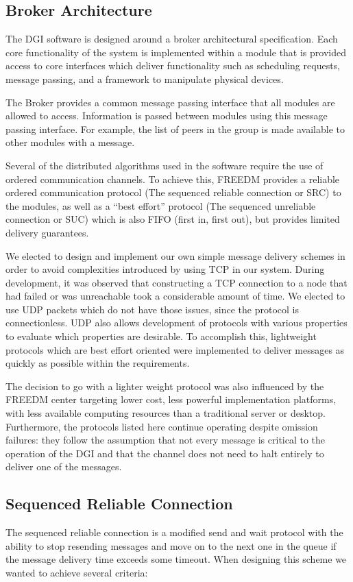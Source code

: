 \subsection{Broker Architecture}
The DGI software is designed around a broker architectural specification.
Each core functionality of the system is implemented within a module that is
provided access to core interfaces which deliver functionality such as
scheduling requests, message passing, and a framework to manipulate physical
devices.

The Broker provides a common message passing interface that all modules are
allowed to access. Information is passed between modules using this message
passing interface. For example, the list of peers in the group is made available
to other modules with a message. 

Several of the distributed algorithms used in the software require the use of
ordered communication channels. To achieve this, FREEDM provides a reliable
ordered communication protocol (The sequenced reliable connection or SRC) to
the modules, as well as a ``best effort'' protocol (The sequenced unreliable
connection or SUC) which is also FIFO (first in, first out), but provides
limited delivery guarantees.

We elected to design and implement our own simple message delivery schemes in
order to avoid complexities introduced by using TCP in our system. During
development, it was observed that constructing a TCP connection to a node that
had failed or was unreachable took a considerable amount of time. We elected to
use UDP packets which do not have those issues, since the protocol is
connectionless. UDP also allows development of protocols with various
properties to evaluate which properties are desirable. To accomplish this,
lightweight protocols which are best effort oriented were implemented to
deliver messages as quickly as possible within the requirements.

The decision to go with a lighter weight protocol was also influenced by the
FREEDM center targeting lower cost, less powerful implementation platforms, with less
available computing resources than a traditional server or desktop.
Furthermore, the protocols listed here continue operating despite omission
failures: they follow the assumption that not every message is critical to the
operation of the DGI and that the channel does not need to halt entirely to
deliver one of the messages.

\subsection{Sequenced Reliable Connection}
The sequenced reliable connection is a modified send and wait protocol with the
ability to stop resending messages and move on to the next one in the queue if
the message delivery time exceeds some timeout. When designing this scheme we
wanted to achieve several criteria:

